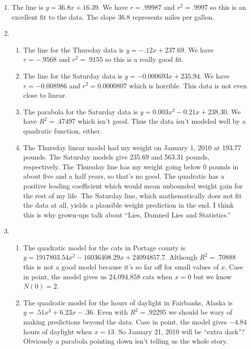 \begin{enumerate}
\begin{enumerate}
\end{enumerate}

\item The line is $y = 36.8x + 16.39$.  We have $r = .99987$ and $r^{2} = .9997$ so this is an excellent fit to the data.  The slope $36.8$ represents miles per gallon.

\item \begin{enumerate}

\item The line for the Thursday data is $y = -.12x + 237.69$.  We have $r = -.9568$ and $r^{2} = .9155$ so this is a really good fit.

\item The line for the Saturday data is $y = -0.000693x + 235.94$.  We have $r = -0.008986$ and $r^{2} = 0.0000807$ which is horrible.  This data is not even close to linear.  

\item The parabola for the Saturday data is $y = 0.003x^{2} - 0.21x + 238.30$.  We have $R^{2} = .47497$ which isn't good.  Thus the data isn't modeled well by a quadratic function, either.

\item The Thursday linear model had my weight on January 1, 2010 at 193.77 pounds.  The Saturday models give 235.69 and 563.31 pounds, respectively.  The Thursday line has my weight going below 0 pounds in about five and a half years, so that's no good.  The quadratic has a positive leading coefficient which would mean unbounded weight gain for the rest of my life.  The Saturday line, which mathematically does not fit the data at all, yields a plausible weight prediction in the end.  I think this is why grown-ups talk about ``Lies, Damned Lies and Statistics.''

\end{enumerate}

\item \begin{enumerate}

\item The quadratic model for the cats in Portage county is $y = 1917803.54x^{2} - 16036408.29x + 24094857.7$.  Although $R^{2} = .70888$ this is not a good model because it's so far off for small values of $x$.  Case in point, the model gives us 24,094,858 cats when $x = 0$ but we know $N(0) = 2$.

\item The quadratic model for the hours of daylight in Fairbanks, Alaska is $y = .51x^{2} + 6.23x - .36$.  Even with $R^{2} = .92295$ we should be wary of making predictions beyond the data.  Case in point, the model gives $-4.84$ hours of daylight when $x = 13$.  So January 21, 2010 will be ``extra dark''?  Obviously a parabola pointing down isn't telling us the whole story.

\end{enumerate}

\end{enumerate}


\closegraphsfile